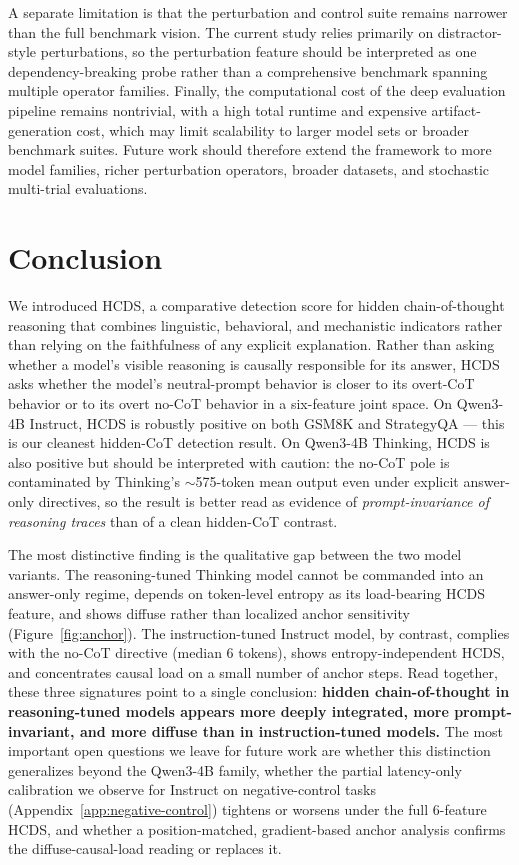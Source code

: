 \documentclass{article}
\theoremstyle{plain}
\theoremstyle{definition}
\theoremstyle{remark}
\begin{document}
A separate limitation is that the perturbation and control suite remains narrower than the full benchmark vision. The current study relies primarily on distractor-style perturbations, so the perturbation feature should be interpreted as one dependency-breaking probe rather than a comprehensive benchmark spanning multiple operator families. Finally, the computational cost of the deep evaluation pipeline remains nontrivial, with a high total runtime and expensive artifact-generation cost, which may limit scalability to larger model sets or broader benchmark suites. Future work should therefore extend the framework to more model families, richer perturbation operators, broader datasets, and stochastic multi-trial evaluations.

\section{Conclusion}

We introduced HCDS, a comparative detection score for hidden chain-of-thought reasoning that combines linguistic, behavioral, and mechanistic indicators rather than relying on the faithfulness of any explicit explanation. Rather than asking whether a model's visible reasoning is causally responsible for its answer, HCDS asks whether the model's neutral-prompt behavior is closer to its overt-CoT behavior or to its overt no-CoT behavior in a six-feature joint space. On Qwen3-4B Instruct, HCDS is robustly positive on both GSM8K and StrategyQA --- this is our cleanest hidden-CoT detection result. On Qwen3-4B Thinking, HCDS is also positive but should be interpreted with caution: the no-CoT pole is contaminated by Thinking's $\sim$575-token mean output even under explicit answer-only directives, so the result is better read as evidence of \emph{prompt-invariance of reasoning traces} than of a clean hidden-CoT contrast.

The most distinctive finding is the qualitative gap between the two model variants. The reasoning-tuned Thinking model cannot be commanded into an answer-only regime, depends on token-level entropy as its load-bearing HCDS feature, and shows diffuse rather than localized anchor sensitivity (Figure~\ref{fig:anchor}). The instruction-tuned Instruct model, by contrast, complies with the no-CoT directive (median 6 tokens), shows entropy-independent HCDS, and concentrates causal load on a small number of anchor steps. Read together, these three signatures point to a single conclusion: \textbf{hidden chain-of-thought in reasoning-tuned models appears more deeply integrated, more prompt-invariant, and more diffuse than in instruction-tuned models.} The most important open questions we leave for future work are whether this distinction generalizes beyond the Qwen3-4B family, whether the partial latency-only calibration we observe for Instruct on negative-control tasks (Appendix~\ref{app:negative-control}) tightens or worsens under the full 6-feature HCDS, and whether a position-matched, gradient-based anchor analysis confirms the diffuse-causal-load reading or replaces it.
\end{document}
